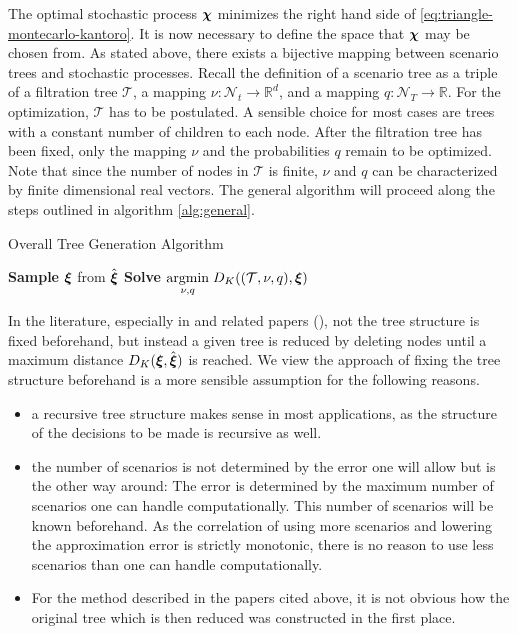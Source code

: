 The optimal stochastic process $\boldsymbol\chi$ minimizes the right hand side of \eqref{eq:triangle-montecarlo-kantoro}.
It is now necessary to define the space that $\boldsymbol\chi$ may be chosen from.
As stated above, there exists a bijective mapping between scenario trees and stochastic processes.
Recall the definition of a scenario tree as a triple of a filtration tree $\mathcal{T}$, a mapping $\nu:\mathcal{N}_t\rightarrow\mathbb{R}^d$, and a mapping $q:\mathcal{N}_T\rightarrow\mathbb{R}$.
For the optimization, $\mathcal{T}$ has to be postulated.
A sensible choice for most cases are trees with a constant number of children to each node.
After the filtration tree has been fixed, only the mapping $\nu$ and the probabilities $q$ remain to be optimized.
Note that since the number of nodes in $\mathcal{T}$ is finite, $\nu$ and $q$ can be characterized by finite dimensional real vectors.
The general algorithm will proceed along the steps outlined in algorithm \ref{alg:general}.
\begin{algorithm}
  \label{alg:general}
  \caption{Overall Tree Generation Algorithm}
  \BlankLine
  \textbf{Sample} $\boldsymbol\xi$ from $\hat{\boldsymbol\xi}$\;
  \textbf{Solve} $\underset{\nu,q}{\operatorname{argmin}}\; D_K((\mathcal{T},\nu, q), \boldsymbol\xi)$\;
\end{algorithm}

In the literature, especially in  and related papers (\cite{Dupacova2003,Heitsch2003,Heitsch2009a,Heitsch2010}), not the tree structure is fixed beforehand, but instead a given tree is reduced by deleting nodes until a maximum distance $D_K(\boldsymbol\xi,\hat{\boldsymbol\xi})$ is reached.
We view the approach of fixing the tree structure beforehand is a more sensible assumption for the following reasons.
\begin{itemize}
\item a recursive tree structure makes sense in most applications, as the structure of the decisions to be made is recursive as well.
\item the number of scenarios is not determined by the error one will allow but is the other way around: The error is determined by the maximum number of scenarios one can handle computationally.
This number of scenarios will be known beforehand.
As the correlation of using more scenarios and lowering the approximation error is strictly monotonic, there is no reason to use less scenarios than one can handle computationally.
\item For the method described in the papers cited above, it is not obvious how the original tree which is then reduced was constructed in the first place.
\end{itemize}

